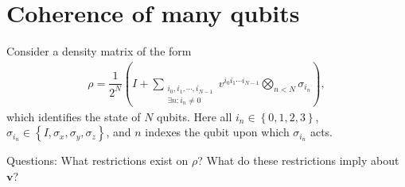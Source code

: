 \documentclass[11pt]{article}
\newcommand{\f}[2]{\dfrac{#1}{#2}} %
\newcommand{\p}[1]{\left(#1\right)} %
\renewcommand{\set}[1]{\left\{#1\right\}} %
\renewcommand{\v}{\bm} %
\begin{document}
\newpage

\section*{Coherence of many qubits}

Consider a density matrix of the form
\begin{align}
  \rho=\f1{2^N}\p{I
    +\sum_{\substack{i_0,i_1,\cdots,i_{N-1}\\\exists n:i_n\ne0}}
    v^{i_0i_1\cdots i_{N-1}}\bigotimes_{n<N}\sigma_{i_n}},
\end{align}
which identifies the state of $N$ qubits. Here all
$i_n\in\set{0,1,2,3}$,
$\sigma_{i_n}\in\set{I,\sigma_x,\sigma_y,\sigma_z}$, and $n$ indexes
the qubit upon which $\sigma_{i_n}$ acts.

Questions: What restrictions exist on $\rho$? What do these
restrictions imply about $\v v$?
\end{document}
